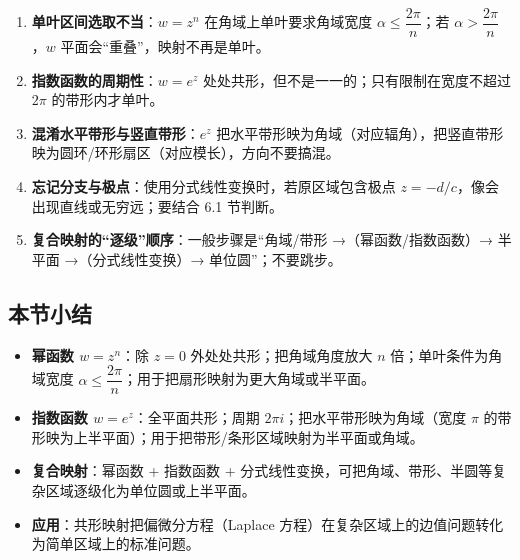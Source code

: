 \begin{enumerate}
\def\labelenumi{\arabic{enumi}.}
\tightlist
\item
  \textbf{单叶区间选取不当}：\(w=z^n\) 在角域上单叶要求角域宽度
  \(\alpha\le\dfrac{2\pi}{n}\)；若 \(\alpha>\dfrac{2\pi}{n}\)，\(w\)
  平面会``重叠''，映射不再是单叶。
\item
  \textbf{指数函数的周期性}：\(w=e^z\)
  处处共形，但不是一一的；只有限制在宽度不超过 \(2\pi\) 的带形内才单叶。
\item
  \textbf{混淆水平带形与竖直带形}：\(e^z\)
  把水平带形映为角域（对应辐角），把竖直带形映为圆环/环形扇区（对应模长），方向不要搞混。
\item
  \textbf{忘记分支与极点}：使用分式线性变换时，若原区域包含极点
  \(z=-d/c\)，像会出现直线或无穷远；要结合 6.1 节判断。
\item
  \textbf{复合映射的``逐级''顺序}：一般步骤是``角域/带形
  →（幂函数/指数函数）→ 半平面 →（分式线性变换）→ 单位圆''；不要跳步。
\end{enumerate}

\subsection{本节小结}\label{ux672cux8282ux5c0fux7ed3-20}

\begin{itemize}
\tightlist
\item
  \textbf{幂函数 \(w=z^n\)}：除 \(z=0\) 外处处共形；把角域角度放大 \(n\)
  倍；单叶条件为角域宽度
  \(\alpha\le\dfrac{2\pi}{n}\)；用于把扇形映射为更大角域或半平面。
\item
  \textbf{指数函数 \(w=e^z\)}：全平面共形；周期
  \(2\pi i\)；把水平带形映为角域（宽度 \(\pi\)
  的带形映为上半平面）；用于把带形/条形区域映射为半平面或角域。
\item
  \textbf{复合映射}：幂函数 + 指数函数 +
  分式线性变换，可把角域、带形、半圆等复杂区域逐级化为单位圆或上半平面。
\item
  \textbf{应用}：共形映射把偏微分方程（Laplace
  方程）在复杂区域上的边值问题转化为简单区域上的标准问题。
\end{itemize}

\newpage
